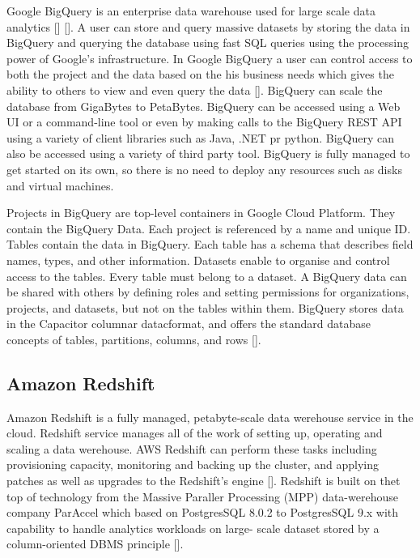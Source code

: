 Google BigQuery is an enterprise data warehouse used for large scale
data analytics [\cite{www-bigquery-documentation}] [\cite{www-bigquery}].
A user can store and query massive datasets by storing the data in
BigQuery and querying the database using fast SQL queries using the
processing power of Google's infrastructure. In Google BigQuery a user
can control access to both the project and the data based on the his
business needs which gives the ability to others to view and even
query the data [\cite{www-bigquery}]. BigQuery can scale the database
from GigaBytes to PetaBytes. BigQuery can be accessed using a Web UI
or a command-line tool or even by making calls to the BigQuery REST
API using a variety of client libraries such as Java, .NET pr
python. BigQuery can also be accessed using a variety of third party
tool. BigQuery is fully managed to get started on its own, so there is
no need to deploy any resources such as disks and virtual machines.

Projects in BigQuery are top-level containers in Google Cloud
Platform\cite{www-bigquery-documentation}. They contain the BigQuery
Data. Each project is referenced by a name and unique ID. Tables
contain the data in BigQuery. Each table has a schema that describes
field names, types, and other information. Datasets enable to organise
and control access to the tables. Every table must belong to a
dataset. A BigQuery data can be shared with others by defining roles
and setting permissions for organizations, projects, and datasets, but
not on the tables within them. BigQuery stores data in the Capacitor
columnar datacformat, and offers the standard database concepts of
tables, partitions, columns, and
rows [\cite{www-bigquery-columnar-storage}].



     
\subsection{Amazon Redshift}
     
Amazon Redshift is a fully managed, petabyte-scale data werehouse
service in the cloud. Redshift service manages all of the work of
setting up, operating and scaling a data werehouse. AWS Redshift can
perform these tasks including provisioning capacity, monitoring and
backing up the cluster, and applying patches as well as upgrades to
the Redshift's engine [\cite{www-redshift}].  Redshift is built on thet
top of technology from the Massive Paraller Processing (MPP)
data-werehouse company ParAccel which based on PostgresSQL 8.0.2 to
PostgresSQL 9.x with capability to handle analytics workloads on
large- scale dataset stored by a column-oriented DBMS
principle [\cite{www-wiki-red}].

